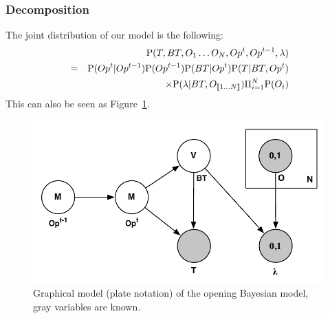 \subsubsection{Decomposition}
The joint distribution of our model is the following:
\begin{eqnarray}
& & \mathrm{P}(T, BT, O_1 \dots O_N, Op^t, Op^{t-1}, \lambda) \\ 
& = &   \mathrm{P}(Op^t | Op^{t-1}) \mathrm{P}(Op^{t-1}) \mathrm{P}(BT | Op^t) \mathrm{P}(T | BT, Op^t) \\
& & \times \mathrm{P}(\lambda | BT, O_{\llbracket 1 \dots N\rrbracket}) \Pi_{i=1}^N \mathrm{P}(O_i)
\end{eqnarray}
This can also be seen as Figure~\ref{fig:openingplate}.

\begin{figure}[h]
\centerline{\includegraphics[width=0.7\columnwidth]{images/OpeningPrediction_plate.pdf}}
\caption{Graphical model (plate notation) of the opening Bayesian model, gray variables are known.}
\label{fig:openingplate}
\end{figure}

